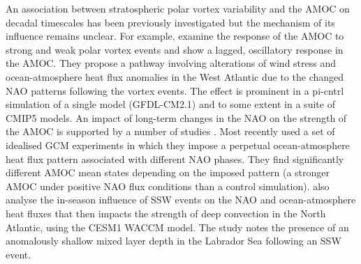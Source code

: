 An association between stratospheric polar vortex variability and the AMOC on decadal timescales has been previously investigated \citep{reichlerStratospheric2012b, schimankeMultidecadal2011b} but the mechanism of its influence remains unclear. For example, \cite{reichlerStratospheric2012b} examine the response of the AMOC to strong and weak polar vortex events and show a lagged, oscillatory response in the AMOC. They propose a pathway involving alterations of wind stress and ocean-atmosphere heat flux anomalies in the West Atlantic due to the changed NAO patterns following the vortex events. The effect is prominent in a pi-cntrl simulation of a single model (GFDL-CM2.1) and to some extent in a suite of CMIP5 models. An impact of long-term changes in the NAO on the strength of the AMOC is supported by a number of studies \citep{visbeckOcean1998b, delworthImplications2000b, delworthMultidecadal2000b, edenMechanism2001b, lohmannResponse2009, robsonCauses2012c}. Most recently \cite{delworthImpact2016c} used a set of idealised GCM experiments in which they impose a perpetual ocean-atmosphere heat flux pattern associated with different NAO phases. They find significantly different AMOC mean states depending on the imposed pattern (a stronger AMOC under positive NAO flux conditions than a control simulation). \cite{haaseImportance2018b} also analyse the in-season influence of SSW events on the NAO and ocean-atmosphere heat fluxes that then impacts the strength of deep convection in the North Atlantic, using the CESM1 WACCM model. The study notes the presence of an anomalously shallow  mixed layer depth in the Labrador Sea following an SSW event. 

